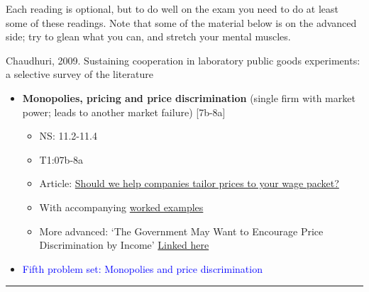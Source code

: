 \documentclass[]{article}
\providecommand{\tightlist}{%
  \setlength{\itemsep}{0pt}\setlength{\parskip}{0pt}}
\begin{document}
Each reading is optional, but to do well on the exam you need to do at least some of these readings. Note that some of the material below is on the advanced side; try to glean what you can, and stretch your mental muscles.

Chaudhuri, 2009. Sustaining cooperation in laboratory public goods experiments: a selective survey of the literature

\begin{itemize}
\tightlist
\item
  \textbf{Monopolies, pricing and price discrimination} (single firm with market power; leads to another market failure) {[}7b-8a{]}

  \begin{itemize}
  \tightlist
  \item
    NS: 11.2-11.4
  \item
    T1:07b-8a
  \item
    Article: \href{https://theconversation.com/should-we-help-companies-tailor-prices-to-your-wage-packet-47719}{Should we help companies tailor prices to your wage packet?}
  \item
    With accompanying \href{https://docs.google.com/document/d/16jos_PT9w1wGpyD5A8ZiWJ9HW6kaLOJH6EWc_AYWnkk/pub}{worked examples}
  \item
    More advanced: `The Government May Want to Encourage Price Discrimination by Income' \href{https://davidreinstein.wordpress.com/research-and-publications/}{Linked here}
  \end{itemize}
\item
  \textcolor{blue}{Fifth problem set: Monopolies and price discrimination}
\end{itemize}

\begin{center}\rule{0.5\linewidth}{\linethickness}\end{center}
\end{document}
